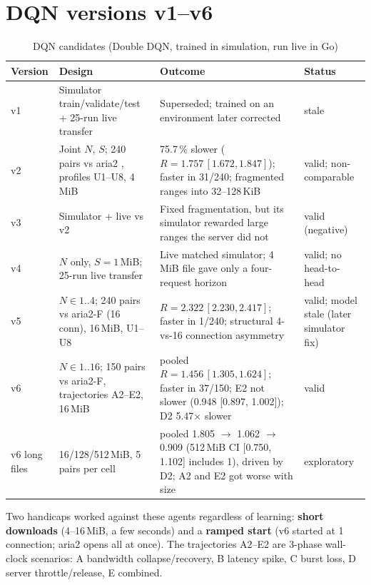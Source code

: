 \section{DQN versions v1--v6}
\begin{table}[H]\centering\small
\caption{DQN candidates (Double DQN, trained in simulation, run live in Go)}\label{tab:dqn}
\begin{tabularx}{\linewidth}{@{}P{2.0cm}P{4.3cm}LP{2.0cm}@{}}
\toprule
\textbf{Version} & \textbf{Design} & \textbf{Outcome} & \textbf{Status}\\
\midrule
v1 & Simulator train/validate/test + 25-run live transfer & Superseded; trained on an environment later corrected & stale\\
v2 & Joint $N$, $S$; 240 pairs vs aria2 , profiles U1--U8, 4\,MiB & 75.7\,\% slower ($R=1.757\,[1.672, 1.847]$); faster in 31/240; fragmented ranges into 32--128\,KiB & valid; non-comparable\\
v3 & Simulator + live vs v2 & Fixed fragmentation, but its simulator rewarded large ranges the server did not & valid (negative)\\
v4 & $N$ only, $S=1$\,MiB; 25-run live transfer & Live matched simulator; 4\,MiB file gave only a four-request horizon & valid; no head-to-head\\
v5 & $N\in1..4$; 240 pairs vs aria2-F (16 conn), 16\,MiB, U1--U8 & $R=2.322\,[2.230, 2.417]$; faster in 1/240; structural 4-vs-16 connection asymmetry & valid; model stale (later simulator fix)\\
v6 & $N\in1..16$; 150 pairs vs aria2-F, trajectories A2--E2, 16\,MiB & pooled $R=1.456\,[1.305, 1.624]$; faster in 37/150; E2 not slower (0.948 [0.897, 1.002]); D2 5.47$\times$ slower & valid\\
v6 long files & 16/128/512\,MiB, 5 pairs per cell & pooled 1.805 $\to$ 1.062 $\to$ 0.909 (512\,MiB CI [0.750, 1.102] includes 1), driven by D2; A2 and E2 got worse with size & exploratory\\
\bottomrule
\end{tabularx}
\end{table}
Two handicaps worked against these agents regardless of learning: \textbf{short downloads} (4--16\,MiB, a few seconds) and a \textbf{ramped start} (v6 started at 1 connection; aria2 opens all at once). The trajectories A2--E2 are 3-phase wall-clock scenarios: A bandwidth collapse/recovery, B latency spike, C burst loss, D server throttle/release, E combined.

